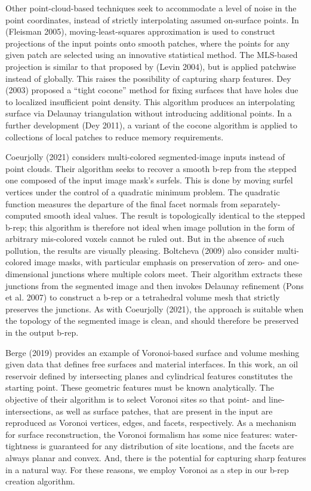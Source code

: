 Other point-cloud-based techniques seek to accommodate a level of noise in the point coordinates, instead of strictly interpolating assumed on-surface points.  In (Fleisman 2005), moving-least-squares approximation is used to construct projections of the input points onto smooth patches, where the points for any given patch are selected using an innovative statistical method.  The MLS-based projection is similar to that proposed by (Levin 2004), but is applied patchwise instead of globally.  This raises the possibility of capturing sharp features. Dey (2003) proposed a ``tight cocone'' method for fixing surfaces that have holes due to localized insufficient point density.  This algorithm produces an interpolating surface via Delaunay triangulation without introducing additional points.  In a further development (Dey 2011), a variant of the cocone algorithm is applied to collections of local patches to reduce memory requirements.  

Coeurjolly (2021) considers multi-colored segmented-image inputs instead of point clouds.  Their algorithm seeks to recover a smooth b-rep from the stepped one composed of the input image mask's surfels.  This is done by moving surfel vertices under the control of a quadratic minimum problem.  The quadratic function measures the departure of the final facet normals from separately-computed smooth ideal values.  The result is topologically identical to the stepped b-rep; this algorithm is therefore not ideal when image pollution in the form of arbitrary mis-colored voxels cannot be ruled out.  But in the absence of such pollution, the results are visually pleasing.  Boltcheva (2009) also consider multi-colored image masks, with particular emphasis on preservation of zero- and one-dimensional junctions where multiple colors meet.  Their algorithm extracts these junctions from the segmented image and then invokes Delaunay refinement (Pons et al. 2007) to construct a b-rep or a tetrahedral volume mesh that strictly preserves the junctions.  As with Coeurjolly (2021), the approach is suitable when the topology of the segmented image is clean, and should therefore be preserved in the output b-rep.  

Berge (2019) provides an example of Voronoi-based surface and volume meshing given data that defines free surfaces and material interfaces.  In this work, an oil reservoir defined by intersecting planes and cylindrical features constitutes the starting point.  These geometric features must be known analytically.  The objective of their algorithm is to select Voronoi sites so that point- and line-intersections, as well as surface patches, that are present in the input are reproduced as Voronoi vertices, edges, and facets, respectively.  As a mechanism for surface reconstruction, the Voronoi formalism has some nice features:  water-tightness is guaranteed for any distribution of site locations, and the facets are always planar and convex.  And, there is the potential for capturing sharp features in a natural way.  For these reasons, we employ Voronoi as a step in our b-rep creation algorithm.

